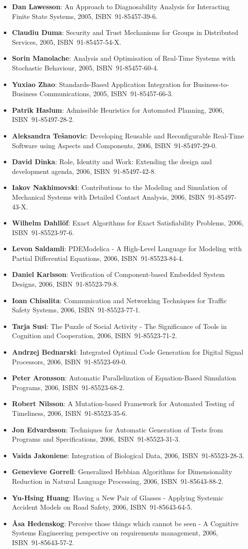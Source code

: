 \documentclass[a4paper,showtrims,twocolumn]{memoir}
\newenvironment{theses}{
  \begin{itemize}
    \setlength{\itemsep}{0.2em}
    \setlength{\parskip}{0em}
    \setlength{\parsep}{0em}
}{
  \end{itemize}
}
\newcommand{\thesis}[5]{\item[No.~#1] \textbf{#2}: #3, #4, ISBN~#5.}
\begin{document}
\begin{theses}
    \thesis{974}{Dan Lawesson}{An Approach to Diagnosability Analysis for Interacting Finite State Systems}{2005}{91-85457-39-6}
    \thesis{979}{Claudiu Duma}{Security and Trust Mechanisms for Groups in Distributed Services}{2005}{91-85457-54-X}
    \thesis{983}{Sorin Manolache}{Analysis and Optimisation of Real-Time Systems with Stochastic Behaviour}{2005}{91-85457-60-4}
    \thesis{986}{Yuxiao Zhao}{Standards-Based Application Integration for Business-to-Business Communications}{2005}{91-85457-66-3}
    \thesis{1004}{Patrik Haslum}{Admissible Heuristics for Automated Planning}{2006}{91-85497-28-2}
    \thesis{1005}{Aleksandra Tešanovic}{Developing Reusable and Reconfigurable Real-Time Software using Aspects and Components}{2006}{91-85497-29-0}
    \thesis{1008}{David Dinka}{Role, Identity and Work: Extending the design and development agenda}{2006}{91-85497-42-8}
    \thesis{1009}{Iakov Nakhimovski}{Contributions to the Modeling and Simulation of Mechanical Systems with Detailed Contact Analysis}{2006}{91-85497-43-X}
    \thesis{1013}{Wilhelm Dahllöf}{Exact Algorithms for Exact Satisfiability Problems}{2006}{91-85523-97-6}
    \thesis{1016}{Levon Saldamli}{PDEModelica - A High-Level Language for Modeling with Partial Differential Equations}{2006}{91-85523-84-4}
    \thesis{1017}{Daniel Karlsson}{Verification of Component-based Embedded System Designs}{2006}{91-85523-79-8}
    \thesis{1018}{Ioan Chisalita}{Communication and Networking Techniques for Traffic Safety Systems}{2006}{91-85523-77-1}
    \thesis{1019}{Tarja Susi}{The Puzzle of Social Activity - The Significance of Tools in Cognition and Cooperation}{2006}{91-85523-71-2}
    \thesis{1021}{Andrzej Bednarski}{Integrated Optimal Code Generation for Digital Signal Processors}{2006}{91-85523-69-0}
    \thesis{1022}{Peter Aronsson}{Automatic Parallelization of Equation-Based Simulation Programs}{2006}{91-85523-68-2}
    \thesis{1030}{Robert Nilsson}{A Mutation-based Framework for Automated Testing of Timeliness}{2006}{91-85523-35-6}
    \thesis{1034}{Jon Edvardsson}{Techniques for Automatic Generation of Tests from Programs and Specifications}{2006}{91-85523-31-3}
    \thesis{1035}{Vaida Jakoniene}{Integration of Biological Data}{2006}{91-85523-28-3}
    \thesis{1045}{Genevieve Gorrell}{Generalized Hebbian Algorithms for Dimensionality Reduction in Natural Language Processing}{2006}{91-85643-88-2}
    \thesis{1051}{Yu-Hsing Huang}{Having a New Pair of Glasses - Applying Systemic Accident Models on Road Safety}{2006}{91-85643-64-5}
    \thesis{1054}{Åsa Hedenskog}{Perceive those things which cannot be seen - A Cognitive Systems Engineering perspective on requirements management}{2006}{91-85643-57-2}

\end{theses}
\end{document}
